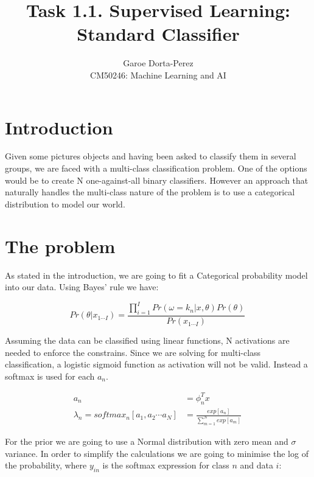 \documentclass[12pt]{article}
\begin{document}
  
\title{Task 1.1. Supervised Learning: Standard Classifier}
\author{Garoe Dorta-Perez\\
CM50246: Machine Learning and AI}
 
\maketitle
 
\section{Introduction}
 
Given some pictures objects and having been asked to classify them in several groups, we are faced with a multi-class classification problem.
One of the options would be to create N one-against-all binary classifiers.
However an approach that naturally handles the multi-class nature of the problem is to use a categorical distribution to model our world. 

\section{The problem}

As stated in the introduction, we are going to fit a Categorical probability model into our data.
Using Bayes' rule we have:

\begin{equation}
\label{bayes}
Pr(\theta | x_{1 \cdots I}) = \frac{\prod_{i = 1}^{I} Pr(\omega = k_{n} | x, \theta) Pr(\theta)} {Pr(x_{1 \cdots I})}\,
\end{equation}

Assuming the data can be classified using linear functions, N activations are needed to enforce the constrains.
Since we are solving for multi-class classification, a logistic sigmoid function as activation will not be valid.
Instead a softmax is used for each $a_{n}$.

\begin{align}
\label{activations}
a_{n} &= \phi_{n}^{T}x \\
\lambda_{n} = softmax_{n}[a_{1}, a_{2} \cdots a_{N}] &= 
\frac{exp[a_{n}]} {\sum_{m = 1}^{N} exp[a_{m}] }\,
\end{align}

For the prior we are going to use a Normal distribution with zero mean and $\sigma$ variance.
In order to simplify the calculations we are going to minimise the log of the probability, where $y_{in}$ is the softmax expression for class $n$ and data $i$:
\end{document}
